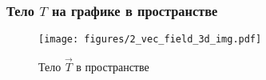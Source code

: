 \begin{frame}\frametitle{Тело \(T\) на графике в пространстве }

  \begin{figure}
		\centering
		\texttt{[image: figures/2\_vec\_field\_3d\_img.pdf]}
		\caption{Тело \(\vec T\) в пространстве}\label{fig:vec_field_graph}
	\end{figure}

\end{frame}
